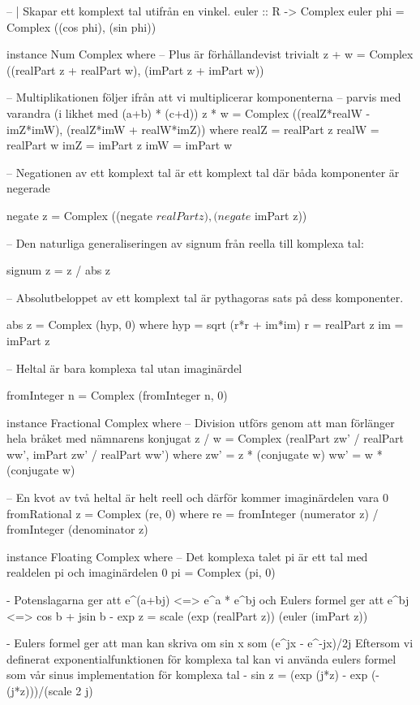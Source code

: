 \begin{codefig}
\begin{code}
-- | Skapar ett komplext tal utifrån en vinkel.
euler :: R -> Complex
euler phi = Complex ((cos phi), (sin phi))

instance Num Complex where
-- Plus är förhållandevist trivialt
  z + w = Complex ((realPart z + realPart w), (imPart z + imPart w))

-- Multiplikationen följer ifrån att vi multiplicerar komponenterna
-- parvis med varandra (i likhet med (a+b) * (c+d))
  z * w = Complex ((realZ*realW - imZ*imW), (realZ*imW + realW*imZ))
    where realZ = realPart z
          realW = realPart w
          imZ   = imPart z
          imW   = imPart w

-- Negationen av ett komplext tal är ett komplext tal där båda komponenter är negerade

  negate z = Complex ((negate $ realPart z), (negate $ imPart z))

-- Den naturliga generaliseringen av signum från reella till komplexa tal:

  signum z = z / abs z

-- Absolutbeloppet av ett komplext tal är pythagoras sats på dess komponenter.

  abs z = Complex (hyp, 0)
    where hyp  = sqrt (r*r + im*im)
          r    = realPart z
          im   = imPart z

-- Heltal är bara komplexa tal utan imaginärdel

  fromInteger n = Complex (fromInteger n, 0)

instance Fractional Complex where
-- Division utförs genom att man förlänger hela bråket med nämnarens konjugat
  z / w = Complex (realPart zw' / realPart ww', imPart zw' / realPart ww')
    where zw' = z * (conjugate w)
          ww' = w * (conjugate w)

-- En kvot av två heltal är helt reell och därför kommer imaginärdelen vara 0
  fromRational z = Complex (re, 0)
    where re = fromInteger (numerator z) / fromInteger (denominator z)

instance Floating Complex where
-- Det komplexa talet pi är ett tal med realdelen pi och imaginärdelen 0
  pi = Complex (pi, 0)

{-
   Potenslagarna ger att e^(a+bj) <=> e^a * e^bj och
   Eulers formel ger att e^bj <=> cos b + jsin b
-}
  exp z = scale (exp (realPart z)) (euler (imPart z))

{-
   Eulers formel ger att man kan skriva om sin x som (e^jx - e^-jx)/2j
   Eftersom vi definerat exponentialfunktionen för komplexa tal kan vi använda
   eulers formel som vår sinus implementation för komplexa tal
-}
  sin z = (exp (j*z) - exp (-(j*z)))/(scale 2 j)


\end{code}
\end{codefig}

